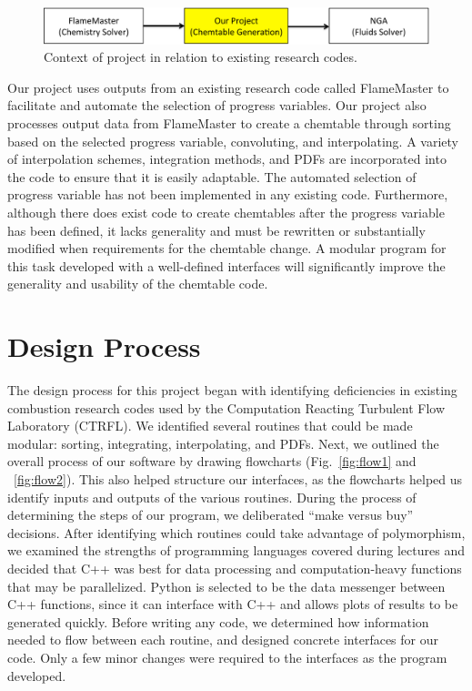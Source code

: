 \documentclass[11pt]{article}
\begin{document}
\begin{figure} [h]
\centering
\includegraphics[width=\textwidth]{scope}
\caption{\label{fig:overview} Context of project in relation to existing research codes.}
\end{figure}

Our project uses outputs from an existing research code called
FlameMaster to facilitate and automate the selection of progress
variables. Our project also processes output data from FlameMaster to
create a chemtable through sorting based on the selected progress
variable, convoluting, and interpolating. A variety of interpolation
schemes, integration methods, and PDFs are incorporated into the code
to ensure that it is easily adaptable. The automated selection of
progress variable has not been implemented in any existing
code. Furthermore, although there does exist code to create chemtables
after the progress variable has been defined, it lacks generality and
must be rewritten or substantially modified when requirements for the
chemtable change. A modular program for this task developed with a
well-defined interfaces will significantly improve the generality and
usability of the chemtable code.

\section{Design Process}
The design process for this project began with identifying
deficiencies in existing combustion research codes used by the
Computation Reacting Turbulent Flow Laboratory (CTRFL). We identified
several routines that could be made modular: sorting, integrating,
interpolating, and PDFs. Next, we outlined the overall process of our
software by drawing flowcharts (Fig.~\ref{fig:flow1} and
~\ref{fig:flow2}). This also helped structure our interfaces, as the
flowcharts helped us identify inputs and outputs of the various
routines. During the process of determining the steps of our program,
we deliberated “make versus buy” decisions. After identifying which
routines could take advantage of polymorphism, we examined the
strengths of programming languages covered during lectures and decided
that C++ was best for data processing and computation-heavy functions
that may be parallelized. Python is selected to be the data messenger
between C++ functions, since it can interface with C++ and allows
plots of results to be generated quickly. Before writing any code, we
determined how information needed to flow between each routine, and
designed concrete interfaces for our code. Only a few minor changes
were required to the interfaces as the program developed.
\end{document}
